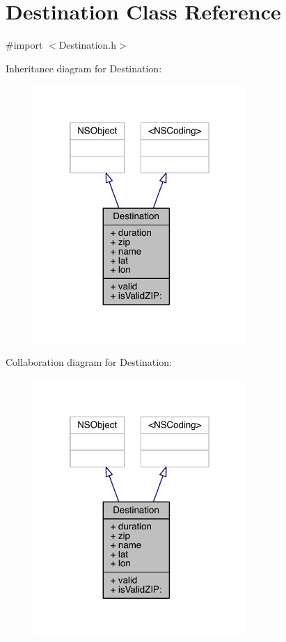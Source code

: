 \hypertarget{interface_destination}{\section{Destination Class Reference}
\label{interface_destination}
}


{\ttfamily \#import $<$Destination.\-h$>$}



Inheritance diagram for Destination\-:
\nopagebreak
\begin{figure}[H]
\begin{center}
\leavevmode
\includegraphics[width=229pt]{interface_destination__inherit__graph}
\end{center}
\end{figure}


Collaboration diagram for Destination\-:
\nopagebreak
\begin{figure}[H]
\begin{center}
\leavevmode
\includegraphics[width=229pt]{interface_destination__coll__graph}
\end{center}
\end{figure}

